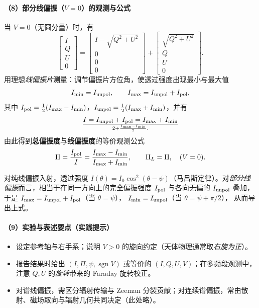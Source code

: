 \paragraph{（8）部分\;线偏振（$V=0$）的观测与公式}
当 $V=0$（无圆分量）时，有
\[
\begin{bmatrix} I\\ Q\\ U\\ 0\end{bmatrix}
=
\begin{bmatrix} I-\sqrt{Q^2+U^2}\\ 0\\ 0\\ 0\end{bmatrix}
+
\begin{bmatrix} \sqrt{Q^2+U^2}\\ Q\\ U\\ 0\end{bmatrix}.
\]
用理想\emph{线偏振片}测量：调节偏振片方位角，使透过强度出现最小与最大值
\[
I_{\min} = I_{\rm unpol},\qquad
I_{\max} = I_{\rm unpol} + I_{\rm pol},
\]
其中 $I_{\rm pol}=\frac12(I_{\max}-I_{\min})$，$I_{\rm unpol}=\frac12(I_{\max}+I_{\min})$，并有
\[
I=I_{\rm unpol}+I_{\rm pol}=I_{\max}+I_{\min}\over 2 + {I_{\max}-I_{\min}\over 2}.
\]
由此得到\textbf{总偏振度}与\textbf{线偏振度}的等价观测公式
\[
\Pi=\frac{I_{\rm pol}}{I}
=\frac{I_{\max}-I_{\min}}{I_{\max}+I_{\min}},\qquad
\Pi_L=\Pi,\quad (V=0).
\]
\begin{derivationnote}
对纯线偏振入射，透过强度 $I(\theta)=I_0\cos^2(\theta-\psi)$（马吕斯定律）。对\emph{部分线偏振}而言，相当于在同一方向上的完全偏振强度 $I_{\rm pol}$ 与各向无偏的 $I_{\rm unpol}$ 叠加，于是
$ I_{\max}= I_{\rm unpol} + I_{\rm pol}$（当 $\theta=\psi$），
$ I_{\min}= I_{\rm unpol}$（当 $\theta=\psi+\pi/2$），
从而导出上式。
\end{derivationnote}

\paragraph{（9）实验与表述要点（实践提示）}
\begin{itemize}[leftmargin=2em]
  \item 设定参考轴与右手系；说明 $V>0$ 的旋向约定（天体物理通常取\emph{右旋为正}）。
  \item 报告结果时给出 $(I,\Pi,\psi,\operatorname{sgn}V)$ 或等价的 $(I,Q,U,V)$；在多频段观测中，注意 $Q,U$ 的\emph{旋转}带来的 Faraday 旋转校正。
  \item 对谱线偏振，需区分辐射传输与 Zeeman 分裂贡献；对连续谱偏振，常由散射、磁场取向与辐射几何共同决定（此处略）。
\end{itemize}
